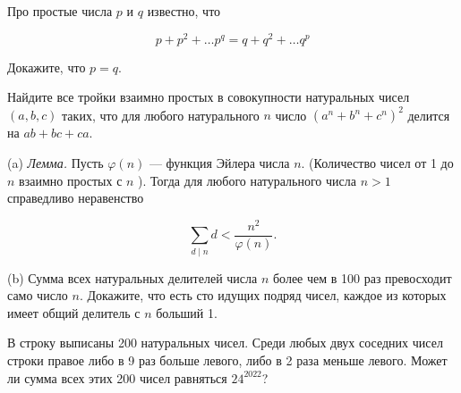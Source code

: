 \hspace{3mm}

Про простые числа $p$ и $q$ известно, что

$$
p+p^2+\ldots p^q=q+q^2+\ldots q^p
$$


Докажите, что $p=q$.

Найдите все тройки взаимно простых в совокупности натуральных чисел $(a, b, c)$ таких, что для любого натурального $n$ число $\left(a^n+b^n+c^n\right)^2$ делится на $a b+b c+c a$.

(a)
\textit{Лемма.}
Пусть $\varphi(n)$ --- функция Эйлера числа $n$. (Количество чисел от 1 до $n$ взаимно простых с $n$ ). Тогда для любого натурального числа $n>1$ справедливо неравенство

$$
\sum_{d \mid n} d<\frac{n^2}{\varphi(n)} .
$$

\noindent
(b)
Сумма всех натуральных делителей числа $n$ более чем в 100 раз превосходит само число $n$. Докажите, что есть сто идущих подряд чисел, каждое из которых имеет общий делитель с $n$ больший 1.

В строку выписаны 200 натуральных чисел. Среди любых двух соседних чисел строки правое либо в 9 раз больше левого, либо в 2 раза меньше левого. Может ли сумма всех этих 200 чисел равняться $24^{2022}$?